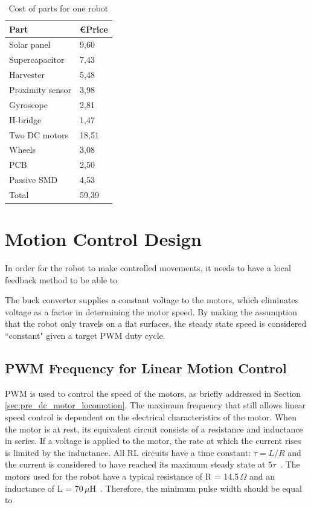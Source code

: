 \begin{table}[t]
	\centering
	\caption{Cost of parts for one robot}
	\label{tab:cost_robot}
	\begin{tabular}{|l|l|} 
		\hline
		Part & \euro Price \\
		\hline\hline
		Solar panel & 9,60\\
		Supercapacitor & 7,43\\
		Harvester & 5,48 \\
		Proximity sensor & 3,98 \\
		Gyroscope & 2,81\\	
		H-bridge & 1,47 \\
		Two DC motors & 18,51 \\
		Wheels & 3,08\\
		PCB & 2,50 \\
		Passive SMD & 4,53\\
		\hline \hline
		Total & 59,39 \\
		\hline
	\end{tabular}
\end{table}


\section{Motion Control Design}
\label{sec:dai_control_design}
In order for the robot to make controlled movements, it needs to have a local feedback method to be able to 

The buck converter supplies a constant voltage to the motors, which eliminates voltage as a factor in determining the motor speed.
By making the assumption that the robot only travels on a flat surfaces, the steady state speed is considered ``constant" given a target PWM duty cycle.

\subsection{PWM Frequency for Linear Motion Control}
\label{sec:cd_pwm_frequency}

PWM is used to control the speed of the motors, as briefly addressed in Section \ref{sec:pre_dc_motor_locomotion}.
The maximum frequency that still allows linear speed control is dependent on the electrical characteristics of the motor.
When the motor is at rest, its equivalent circuit consists of a resistance and inductance in series.
If a voltage is applied to the motor, the rate at which the current rises is limited by the inductance. 
All RL circuits have a time constant: $\tau = L / R$ and the current is considered to have reached its maximum steady state at $5\tau$~\cite{pmw_linear_motion_2017}. 
The motors used for the robot have a typical resistance of R = 14.5\,$\Omega$ and an inductance of L = 70\,$\mu$H~\cite{gearmotor_206-110_2017}.
Therefore, the minimum pulse width should be equal to

